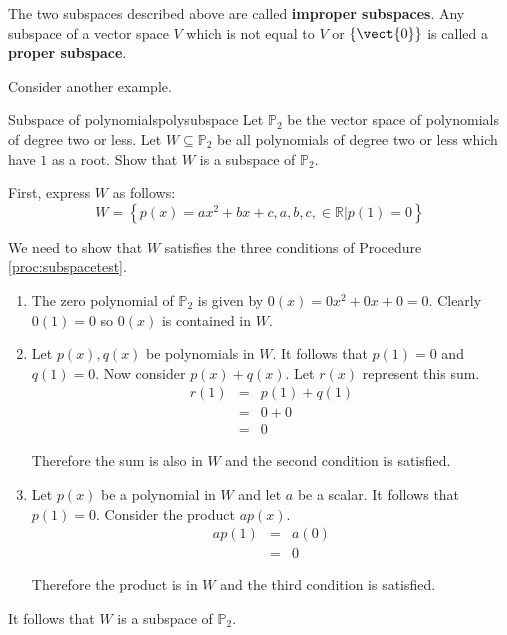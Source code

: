 The two subspaces described above are called \textbf{improper subspaces}. Any subspace of a vector space $V$ which is not equal to $V$ or  $\left\{ \vect{0} \right\}$ is called a \textbf{proper subspace}. 

Consider another example.

\begin{example}{Subspace of polynomials}{polysubspace}
Let $\mathbb{P}_2$ be the vector space of polynomials of degree two or less. Let $W \subseteq \mathbb{P}_2$ be all polynomials of degree two or less which have $1$ as a root. Show that $W$ is a subspace of $\mathbb{P}_2$. 
\end{example}

\begin{solution}
First, express $W$ as follows:
\[
W = \left\{ p(x) = ax^2 +bx +c, a,b,c, \in \mathbb{R} | p(1)  = 0 \right\}
\]

We need to show that $W$ satisfies the three conditions of Procedure \ref{proc:subspacetest}. 
\begin{enumerate}
\item
The zero polynomial of $\mathbb{P}_2$ is given by $0(x) = 0x^2 + 0x + 0 = 0$. Clearly $0(1) = 0$ so $0(x)$ is contained in $W$. 

\item
Let $p(x), q(x)$ be polynomials in $W$.  It follows that $p(1) = 0 $ and $q(1) = 0$. Now consider $p(x) + q(x)$. Let $r(x)$ represent this sum.
\begin{eqnarray*}
r(1) &=& p(1) + q(1) \\
&=& 0 + 0 \\
&=& 0
\end{eqnarray*}

Therefore the sum is also in $W$ and the second condition is satisfied. 

\item
Let $p(x)$ be a polynomial in $W$ and let $a$ be a scalar. It follows that $p(1) = 0$. Consider the product $ap(x)$. 
\begin{eqnarray*}
ap(1) &=& a(0) \\
&=& 0
\end{eqnarray*}

Therefore the product is in $W$ and the third condition is satisfied.
\end{enumerate}

It follows that $W$ is a subspace of $\mathbb{P}_2$. 
\end{solution} 

